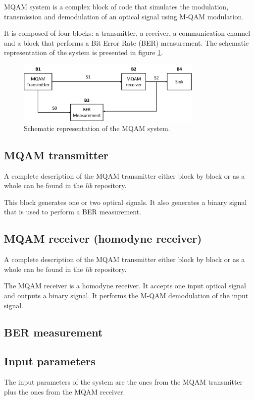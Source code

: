 
MQAM system is a complex block of code that simulates the modulation, transmission and demodulation of an optical signal using M-QAM modulation.
	
It is composed of four blocks: a transmitter, a receiver, a communication channel and a block that performs a Bit Error Rate (BER) measurement. The schematic representation of the system is presented in figure \ref{MQAM_system_block_diagram}.

\begin{figure}
	\centering
	\includegraphics[width=0.8\textwidth]{./figures/MQAM_system_block_diagram}
	\caption{Schematic representation of the MQAM system.}\label{MQAM_system_block_diagram}
\end{figure}

\subsection*{MQAM transmitter}

A complete description of the MQAM transmitter either block by block or as a whole can be found in the \textit{lib} repository. 

This block generates one or two optical signals. It also generates a binary signal that is used to perform a BER measurement.

\subsection*{MQAM receiver (homodyne receiver)}

A complete description of the MQAM transmitter either block by block or as a whole can be found in the \textit{lib} repository.

The MQAM receiver is a homodyne receiver. It accepts one input optical signal and outputs a binary signal. It performs the M-QAM demodulation of the input signal.

\subsection*{BER measurement}

\subsection*{Input parameters}

The input parameters of the system are the ones from the MQAM transmitter plus the ones from the MQAM receiver.

